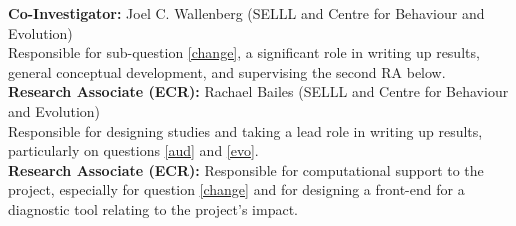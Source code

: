 \documentclass[11pt]{article}
\begin{document}
\noindent\textbf{Co-Investigator:} Joel C. Wallenberg (SELLL and Centre for Behaviour and Evolution)\\
Responsible for sub-question \ref{change}, a significant role in writing up results, general conceptual development, and supervising the second RA below.\\

\noindent\textbf{Research Associate (ECR):} Rachael Bailes (SELLL and Centre for Behaviour and Evolution)\\
Responsible for designing studies and taking a lead role in writing up results, particularly on questions \ref{aud} and \ref{evo}. \\

\noindent\textbf{Research Associate (ECR):} Responsible for computational support to the project, especially for question \ref{change} and for designing a front-end for a diagnostic tool relating to the project's impact.
\end{document}

